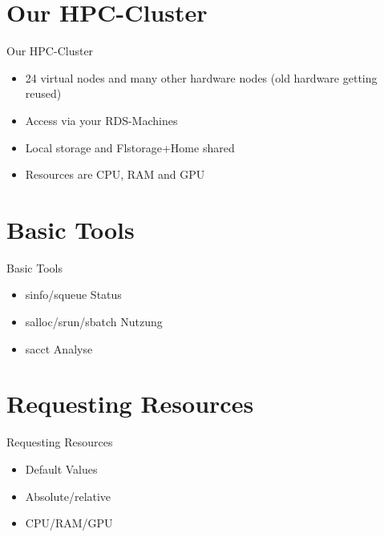 \documentclass{beamer}
\begin{document}
\section{Our HPC-Cluster}
\begin{frame}{Our HPC-Cluster}

	    \begin{itemize}
		\item 24 virtual nodes and many other hardware nodes (old hardware getting reused)
		\item Access via your RDS-Machines
		\item Local storage and Flstorage+Home shared
		\item Resources are CPU, RAM and GPU
	\end{itemize}

\end{frame}

\section{Basic Tools}
\begin{frame}{Basic Tools}
    \begin{itemize}
        \item sinfo/squeue Status
        \item salloc/srun/sbatch Nutzung
        \item sacct Analyse
    \end{itemize}
\end{frame}

\section{Requesting Resources}
\begin{frame}{Requesting Resources}
	\begin{itemize}
		\item Default Values
		\item Absolute/relative
		\item CPU/RAM/GPU
	\end{itemize}
\end{frame}
\end{document}
